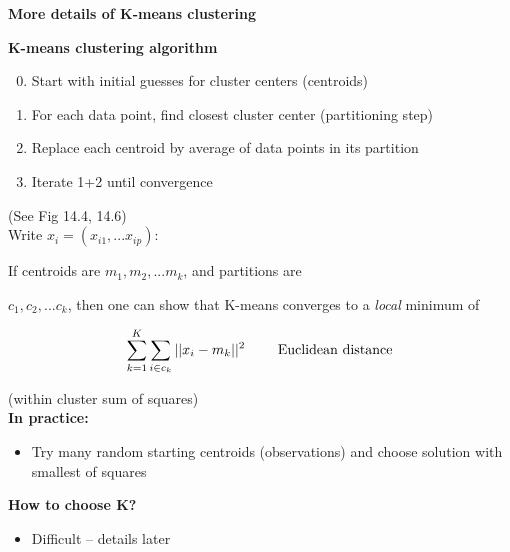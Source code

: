 \begin{slide}
\centerline{\bf More details  of K-means clustering}

\end{slide}
\begin{slide}

{\bf K-means clustering algorithm}

\begin{enumerate}

\setcounter{enumi}{-1}

\item Start with initial guesses for cluster centers (centroids)

\item For each data point, find closest cluster center (partitioning step)

\item Replace each centroid by average of data points in its partition

\item Iterate 1+2 until convergence

\end{enumerate}

(See Fig 14.4, 14.6) \\

Write $x_i = (x_{i1}, ... x_{ip})$:

If centroids are $m_1, m_2, ... m_k$, and partitions are

$c_1, c_2, ... c_k$, then one can show that K-means converges to a {\it local} minimum of

\[
\sum^K_{k=1} \sum_{i\in c_k} || x_i - m_k ||^2 \ \ \ \ \ \ \ \rm Euclidean \ distance
\]

(within cluster sum of squares) \\

{\bf In practice:}

\begin{itemize}

\item Try many random starting centroids (observations) and choose solution with smallest of squares

\end{itemize}

{\bf How to choose K?}

\begin{itemize}

\item Difficult -- details later

\end{itemize}

\end{slide}
